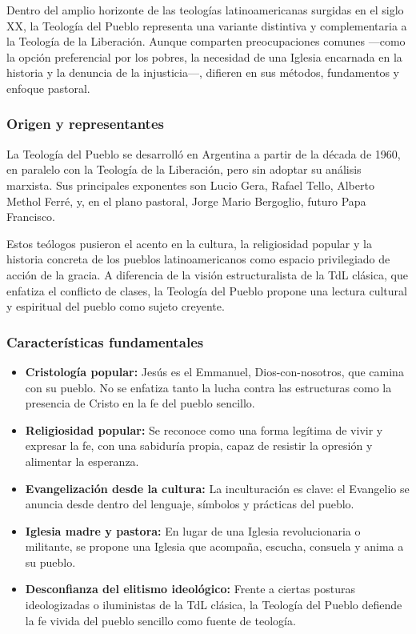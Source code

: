 \documentclass[12pt]{article}
\begin{document}
Dentro del amplio horizonte de las teologías latinoamericanas surgidas en el siglo XX, la Teología del Pueblo representa una variante distintiva y complementaria a la Teología de la Liberación. Aunque comparten preocupaciones comunes ---como la opción preferencial por los pobres, la necesidad de una Iglesia encarnada en la historia y la denuncia de la injusticia---, difieren en sus métodos, fundamentos y enfoque pastoral.

\subsubsection{Origen y representantes}
La Teología del Pueblo se desarrolló en Argentina a partir de la década de 1960, en paralelo con la Teología de la Liberación, pero sin adoptar su análisis marxista. Sus principales exponentes son Lucio Gera, Rafael Tello, Alberto Methol Ferré, y, en el plano pastoral, Jorge Mario Bergoglio, futuro Papa Francisco.

Estos teólogos pusieron el acento en la cultura, la religiosidad popular y la historia concreta de los pueblos latinoamericanos como espacio privilegiado de acción de la gracia. A diferencia de la visión estructuralista de la TdL clásica, que enfatiza el conflicto de clases, la Teología del Pueblo propone una lectura cultural y espiritual del pueblo como sujeto creyente.

\subsubsection{Características fundamentales}
\begin{itemize}
  \item \textbf{Cristología popular:} Jesús es el Emmanuel, Dios-con-nosotros, que camina con su pueblo. No se enfatiza tanto la lucha contra las estructuras como la presencia de Cristo en la fe del pueblo sencillo.
  \item \textbf{Religiosidad popular:} Se reconoce como una forma legítima de vivir y expresar la fe, con una sabiduría propia, capaz de resistir la opresión y alimentar la esperanza.
  \item \textbf{Evangelización desde la cultura:} La inculturación es clave: el Evangelio se anuncia desde dentro del lenguaje, símbolos y prácticas del pueblo.
  \item \textbf{Iglesia madre y pastora:} En lugar de una Iglesia revolucionaria o militante, se propone una Iglesia que acompaña, escucha, consuela y anima a su pueblo.
  \item \textbf{Desconfianza del elitismo ideológico:} Frente a ciertas posturas ideologizadas o iluministas de la TdL clásica, la Teología del Pueblo defiende la fe vivida del pueblo sencillo como fuente de teología.
\end{itemize}
\end{document}
